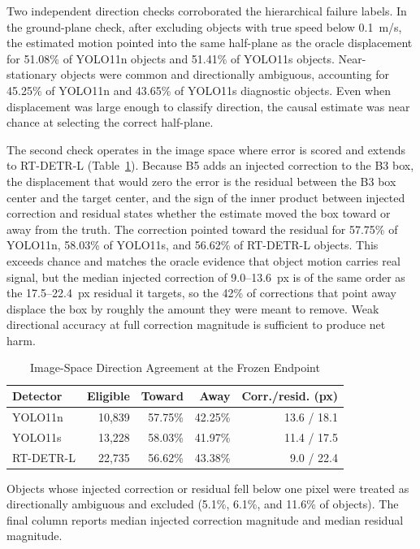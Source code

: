 \documentclass[journal]{IEEEtran}
\begin{document}
Two independent direction checks corroborated the hierarchical failure labels. In the ground-plane check, after excluding objects with true speed below 0.1~m/s, the estimated motion pointed into the same half-plane as the oracle displacement for 51.08\% of YOLO11n objects and 51.41\% of YOLO11s objects. Near-stationary objects were common and directionally ambiguous, accounting for 45.25\% of YOLO11n and 43.65\% of YOLO11s diagnostic objects. Even when displacement was large enough to classify direction, the causal estimate was near chance at selecting the correct half-plane.

The second check operates in the image space where error is scored and extends to RT-DETR-L (Table~\ref{tab:direction}). Because B5 adds an injected correction to the B3 box, the displacement that would zero the error is the residual between the B3 box center and the target center, and the sign of the inner product between injected correction and residual states whether the estimate moved the box toward or away from the truth. The correction pointed toward the residual for 57.75\% of YOLO11n, 58.03\% of YOLO11s, and 56.62\% of RT-DETR-L objects. This exceeds chance and matches the oracle evidence that object motion carries real signal, but the median injected correction of 9.0--13.6~px is of the same order as the 17.5--22.4~px residual it targets, so the 42\% of corrections that point away displace the box by roughly the amount they were meant to remove. Weak directional accuracy at full correction magnitude is sufficient to produce net harm.

\begin{table}[!t]
\caption{Image-Space Direction Agreement at the Frozen Endpoint}
\label{tab:direction}
\centering
\footnotesize
\begin{tabular}{@{}lrrrr@{}}
\toprule
Detector & Eligible & Toward & Away & Corr./resid. (px) \\
\midrule
YOLO11n & 10,839 & 57.75\% & 42.25\% & 13.6 / 18.1 \\
YOLO11s & 13,228 & 58.03\% & 41.97\% & 11.4 / 17.5 \\
RT-DETR-L & 22,735 & 56.62\% & 43.38\% & 9.0 / 22.4 \\
\bottomrule
\end{tabular}
\begin{minipage}{\columnwidth}
\vspace{1mm}\footnotesize
Objects whose injected correction or residual fell below one pixel were treated as directionally ambiguous and excluded (5.1\%, 6.1\%, and 11.6\% of objects). The final column reports median injected correction magnitude and median residual magnitude.
\end{minipage}
\end{table}
\end{document}
